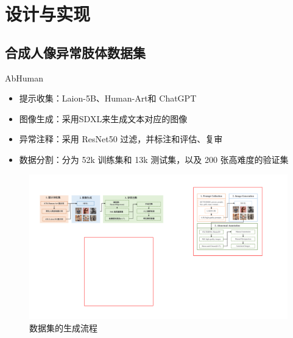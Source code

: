 \documentclass[
    fontset=fandol,
    xcolor=svgnames %
]{ctexbeamer}
\begin{document}


\section{设计与实现}

\subsection{合成人像异常肢体数据集}

\begin{frame}

    \begin{block}{AbHuman}
        \begin{itemize}
            \item 提示收集：Laion-5B、Human-Art和 ChatGPT
            \item 图像生成：采用SDXL来生成文本对应的图像
            \item 异常注释：采用 ResNet50 过滤，并标注和评估、复审
            \item 数据分割：分为 52k 训练集和 13k 测试集，以及 200 张高难度的验证集
        \end{itemize}
    \end{block}
\begin{figure}
    \includegraphics[width=1\columnwidth]{fig/dataset_pipeline.pdf}
            \caption{数据集的生成流程}
            \end{figure}


\end{frame}
\end{document}
